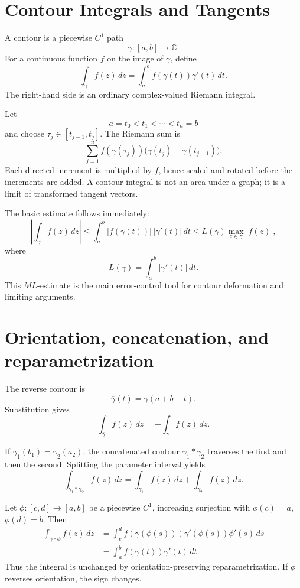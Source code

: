 
\section{Contour Integrals and Tangents}

A contour is a piecewise \(C^1\) path
\[
  \gamma:[a,b]\to\mathbb C.
\]
For a continuous function \(f\) on the image of \(\gamma\), define
\[
  \int_\gamma f(z)\,dz
  =\int_a^b f(\gamma(t))\gamma'(t)\,dt.
\]
The right-hand side is an ordinary complex-valued Riemann integral.

Let
\[
  a=t_0<t_1<\cdots<t_n=b
\]
and choose \(\tau_j\in[t_{j-1},t_j]\).  The Riemann sum is
\[
  \sum_{j=1}^n
  f(\gamma(\tau_j))
  \bigl(\gamma(t_j)-\gamma(t_{j-1})\bigr).
\]
Each directed increment is multiplied by \(f\), hence scaled and rotated before the increments are added.  A contour integral is not an area under a graph; it is a limit of transformed tangent vectors.

The basic estimate follows immediately:
\[
  \left|\int_\gamma f(z)\,dz\right|
  \le
  \int_a^b|f(\gamma(t))|\,|\gamma'(t)|\,dt
  \le
  L(\gamma)\max_{z\in\gamma}|f(z)|,
\]
where
\[
  L(\gamma)=\int_a^b|\gamma'(t)|\,dt.
\]
This \(ML\)-estimate is the main error-control tool for contour deformation and limiting arguments.

\section{Orientation, concatenation, and reparametrization}

The reverse contour is
\[
  \overline\gamma(t)=\gamma(a+b-t).
\]
Substitution gives
\[
  \boxed{
  \int_{\overline\gamma}f(z)\,dz
  =-\int_\gamma f(z)\,dz.}
\]

If \(\gamma_1(b_1)=\gamma_2(a_2)\), the concatenated contour \(\gamma_1*\gamma_2\) traverses the first and then the second.  Splitting the parameter interval yields
\[
  \boxed{
  \int_{\gamma_1*\gamma_2}f(z)\,dz
  =\int_{\gamma_1}f(z)\,dz
  +\int_{\gamma_2}f(z)\,dz.}
\]

Let \(\phi:[c,d]\to[a,b]\) be a piecewise \(C^1\), increasing surjection with \(\phi(c)=a\), \(\phi(d)=b\).  Then
\[
\begin{aligned}
  \int_{\gamma\circ\phi}f(z)\,dz
  &=\int_c^d
  f(\gamma(\phi(s)))
  \gamma'(\phi(s))\phi'(s)\,ds\\
  &=\int_a^b f(\gamma(t))\gamma'(t)\,dt.
\end{aligned}
\]
Thus the integral is unchanged by orientation-preserving reparametrization.  If \(\phi\) reverses orientation, the sign changes.

